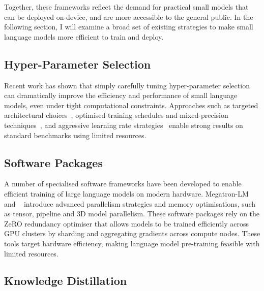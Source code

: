 Together, these frameworks reflect the demand for practical small models that can be deployed on-device, and are more accessible to the general public. In the following section, I will examine a broad set of existing strategies to make small language models more efficient to train and deploy.

\subsection{Hyper-Parameter Selection}

Recent work has shown that simply carefully tuning hyper-parameter selection can dramatically improve the efficiency and performance of small language models, even under tight computational constraints. Approaches such as targeted architectural choices~\citep{hillier2024super}, optimised training schedules and mixed-precision techniques~\citep{izsak2021train}, and aggressive learning rate strategies~\citep{geiping2023cramming} enable strong results on standard benchmarks using limited resources.

\subsection{Software Packages}

A number of specialised software frameworks have been developed to enable efficient training of large language models on modern hardware. Megatron-LM~\citep{narayanan2021megatron} and ~\citep{rasley2020deepspeed} introduce advanced parallelism strategies and memory optimisations, such as tensor, pipeline and 3D model parallelism. These software packages rely on the ZeRO redundancy optimiser \citep{rajbhandari2020zero} that allows models to be trained efficiently across GPU clusters by sharding and aggregating gradients across compute nodes. These tools target hardware efficiency, making language model pre-training feasible with limited resources.

\subsection{Knowledge Distillation}

